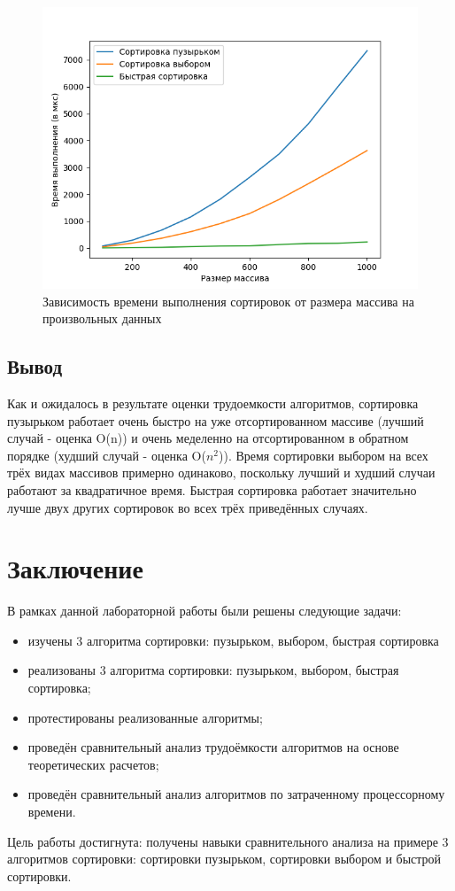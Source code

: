 \documentclass[12pt]{report}
\begin{document}
\begin{figure}[H]
	\centering
	\includegraphics[scale = 0.8]{rand.png}
	\caption{Зависимость времени выполнения сортировок от размера массива на произвольных данных}
	\label{fig:mpr3}
\end{figure}

\section{Вывод}

Как и ожидалось в результате оценки трудоемкости алгоритмов, сортировка пузырьком работает очень быстро на уже отсортированном массиве (лучший случай - оценка O(n)) и очень меделенно на отсортированном в обратном порядке (худший случай - оценка O($n^2$)). Время сортировки выбором на всех трёх видах массивов примерно одинаково, поскольку лучший и худший случаи работают за квадратичное время. Быстрая сортировка работает значительно лучше двух других сортировок во всех трёх приведённых случаях.


\chapter*{Заключение}

В рамках данной лабораторной работы были решены следующие задачи:

\begin{itemize}
	\item изучены 3 алгоритма сортировки: пузырьком, выбором, быстрая сортировка
	\item реализованы 3 алгоритма сортировки: пузырьком, выбором, быстрая сортировка;
	\item протестированы реализованные алгоритмы;
	\item проведён сравнительный анализ трудоёмкости алгоритмов на основе теоретических расчетов;
	\item проведён сравнительный анализ алгоритмов по затраченному процессорному времени.
\end{itemize}
Цель работы достигнута: получены навыки сравнительного анализа на примере 3 алгоритмов сортировки: сортировки пузырьком, сортировки выбором и быстрой сортировки. 
\end{document}
